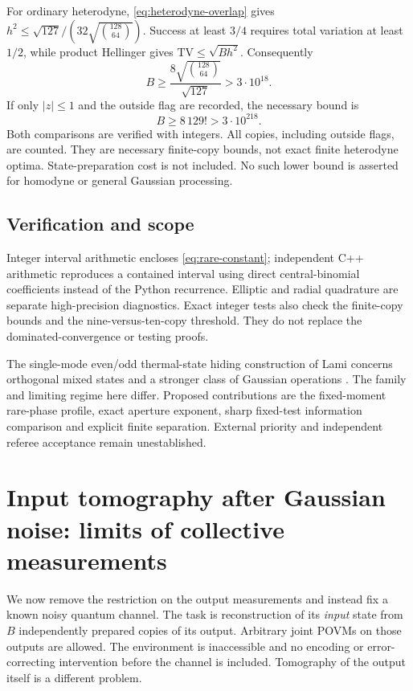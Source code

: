 For ordinary heterodyne, \eqref{eq:heterodyne-overlap} gives
$h^2\le\sqrt{127}/(32\sqrt{\binom{128}{64}})$.
Success at least $3/4$ requires total variation at least $1/2$, while
product Hellinger gives $\mathrm{TV}\le\sqrt{Bh^2}$. Consequently
\[
 \boxed{ B\ge\frac{8\sqrt{\binom{128}{64}}}{\sqrt{127}}
                         >3\cdot10^{18}. }
 \tag{C.21}\label{eq:rare-heterodyne-copies}
\]
If only $|z|\le1$ and the outside flag are recorded, the necessary bound is
\[
 \boxed{ B\ge8\,129!>3\cdot10^{218}. }
 \tag{C.22}\label{eq:rare-unit-copies}
\]
Both comparisons are verified with integers. All copies, including outside
flags, are counted. They are necessary finite-copy bounds, not exact finite
heterodyne optima. State-preparation cost is not included. No such lower
bound is asserted for homodyne or general Gaussian processing.

\subsection{Verification and scope}
Integer interval arithmetic encloses \eqref{eq:rare-constant}; independent
C++ arithmetic reproduces a contained interval using direct central-binomial
coefficients instead of the Python recurrence. Elliptic and radial
quadrature are separate high-precision diagnostics. Exact integer tests
also check the finite-copy bounds and the nine-versus-ten-copy threshold.
They do not replace the dominated-convergence or testing proofs.

The single-mode even/odd thermal-state hiding construction of Lami concerns
orthogonal mixed states and a stronger class of Gaussian operations
\cite{Lami2021}. The family and limiting regime here differ. Proposed
contributions are the fixed-moment rare-phase profile, exact aperture
exponent, sharp fixed-test information comparison and explicit finite
separation. External priority and independent referee acceptance remain
unestablished.

\section{Input tomography after Gaussian noise: limits of collective measurements}
\label{sec:gaussian-inverse}
We now remove the restriction on the output measurements and instead fix a
known noisy quantum channel. The task is reconstruction of its \emph{input}
state from $B$ independently prepared copies of its output. Arbitrary joint
POVMs on those outputs are allowed. The environment is inaccessible and no
encoding or error-correcting intervention before the channel is included.
Tomography of the output itself is a different problem.

